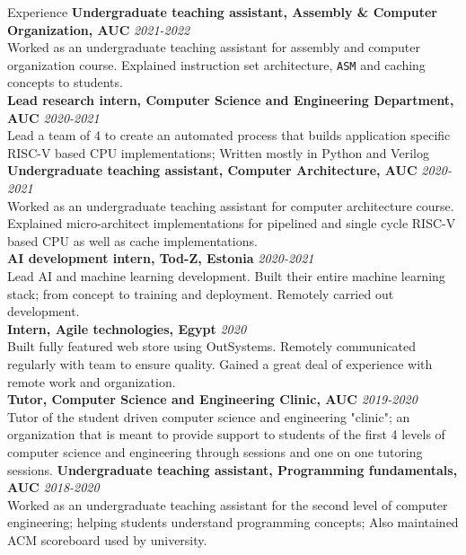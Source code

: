 \documentclass{resume}
\begin{document}
\begin{small}
	\begin{rSection}{Experience}
		{\bf Undergraduate teaching assistant, Assembly \& Computer Organization, AUC} \hfill {\em 2021-2022} \\
		Worked as an undergraduate teaching assistant for assembly and computer organization course. Explained instruction set architecture, \verb|ASM| and caching concepts to students. \\
		{\bf Lead research intern, Computer Science and Engineering Department, AUC} \hfill {\em 2020-2021} \\
		Lead a team of 4 to create an automated process that builds application specific RISC-V based CPU implementations; Written mostly in Python and Verilog \\
		{\bf Undergraduate teaching assistant, Computer Architecture, AUC} \hfill {\em 2020-2021} \\
		Worked as an undergraduate teaching assistant for computer architecture course. Explained micro-architect implementations for pipelined and single cycle RISC-V based CPU as well as cache implementations. \\
		{\bf AI development intern, Tod-Z, Estonia} \hfill {\em 2020-2021} \\
		Lead AI and machine learning development. Built their entire machine learning stack; from concept to training and deployment. Remotely carried out development. \\
		{\bf Intern, Agile technologies, Egypt} \hfill {\em 2020} \\
		Built fully featured web store using OutSystems. Remotely communicated regularly with team to ensure quality. Gained a great deal of experience with remote work and organization. \\
		{\bf Tutor, Computer Science and Engineering Clinic, AUC} \hfill {\em 2019-2020} \\
		Tutor of the student driven computer science and engineering "clinic"; an organization that is meant to provide support to students of the first 4 levels of computer science and engineering through sessions and one on one tutoring sessions.
		{\bf Undergraduate teaching assistant, Programming fundamentals, AUC} \hfill {\em 2018-2020} \\
		Worked as an undergraduate teaching assistant for the second level of computer engineering; helping students understand programming concepts; Also maintained ACM scoreboard used by university. \\
	\end{rSection}


\end{small}
\end{document}
